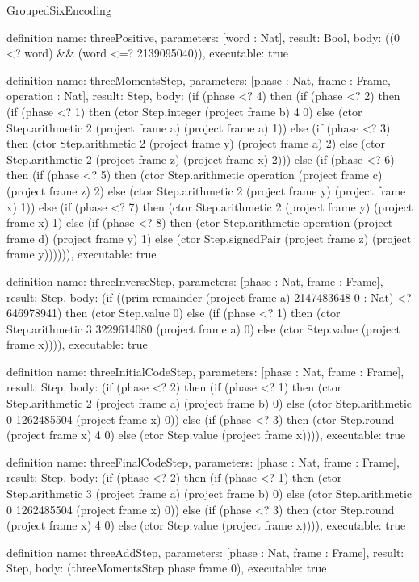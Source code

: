 \begin{lexlean}{GroupedSixEncoding}
\begin{semanticmodule}
definition{
  name: threePositive,
  parameters: [word : Nat],
  result: Bool,
  body: ((0 <? word) && (word <=? 2139095040)),
  executable: true
}

definition{
  name: threeMomentsStep,
  parameters: [phase : Nat, frame : Frame, operation : Nat],
  result: Step,
  body: (if (phase <? 4) then (if (phase <? 2) then (if (phase <? 1) then (ctor Step.integer (project frame b) 4 0) else (ctor Step.arithmetic 2 (project frame a) (project frame a) 1)) else (if (phase <? 3) then (ctor Step.arithmetic 2 (project frame y) (project frame a) 2) else (ctor Step.arithmetic 2 (project frame z) (project frame x) 2))) else (if (phase <? 6) then (if (phase <? 5) then (ctor Step.arithmetic operation (project frame c) (project frame z) 2) else (ctor Step.arithmetic 2 (project frame y) (project frame x) 1)) else (if (phase <? 7) then (ctor Step.arithmetic 2 (project frame y) (project frame x) 1) else (if (phase <? 8) then (ctor Step.arithmetic operation (project frame d) (project frame y) 1) else (ctor Step.signedPair (project frame z) (project frame y)))))),
  executable: true
}

definition{
  name: threeInverseStep,
  parameters: [phase : Nat, frame : Frame],
  result: Step,
  body: (if ((prim remainder (project frame a) 2147483648 0 : Nat) <? 646978941) then (ctor Step.value 0) else (if (phase <? 1) then (ctor Step.arithmetic 3 3229614080 (project frame a) 0) else (ctor Step.value (project frame x)))),
  executable: true
}

definition{
  name: threeInitialCodeStep,
  parameters: [phase : Nat, frame : Frame],
  result: Step,
  body: (if (phase <? 2) then (if (phase <? 1) then (ctor Step.arithmetic 2 (project frame a) (project frame b) 0) else (ctor Step.arithmetic 0 1262485504 (project frame x) 0)) else (if (phase <? 3) then (ctor Step.round (project frame x) 4 0) else (ctor Step.value (project frame x)))),
  executable: true
}

definition{
  name: threeFinalCodeStep,
  parameters: [phase : Nat, frame : Frame],
  result: Step,
  body: (if (phase <? 2) then (if (phase <? 1) then (ctor Step.arithmetic 3 (project frame a) (project frame b) 0) else (ctor Step.arithmetic 0 1262485504 (project frame x) 0)) else (if (phase <? 3) then (ctor Step.round (project frame x) 4 0) else (ctor Step.value (project frame x)))),
  executable: true
}

definition{
  name: threeAddStep,
  parameters: [phase : Nat, frame : Frame],
  result: Step,
  body: (threeMomentsStep phase frame 0),
  executable: true
}


\end{semanticmodule}
\end{lexlean}

